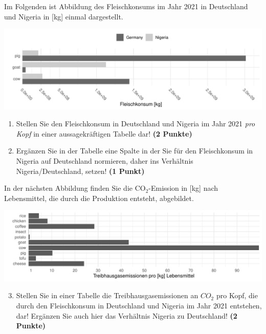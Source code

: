 \documentclass[a4paper, 9pt]{scrartcl}\usepackage[]{graphicx}\usepackage[]{xcolor}
\makeatletter
\def\maxwidth{ %
  \ifdim\Gin@nat@width>\linewidth
    \linewidth
  \else
    \Gin@nat@width
  \fi
}
\newenvironment{knitrout}{}{} %
\makeatother
\begin{document}
Im Folgenden ist Abbildung des Fleischkonsums im Jahr 2021 in Deutschland und Nigeria in [kg] einmal dargestellt. 

\begin{knitrout}
\color{fgcolor}

{\centering \includegraphics[width=\maxwidth]{img/math-14-a-1} 

}


\end{knitrout}
  
\begin{enumerate}
\item Stellen Sie den Fleischkonsum in Deutschland und Nigeria im Jahr 2021 \textit{pro Kopf} in einer aussagekräftigen Tabelle dar! \textbf{(2 Punkte)}
\item Ergänzen Sie in der Tabelle eine Spalte in der Sie für den Fleischkonsum in Nigeria auf Deutschland normieren, daher ins Verhältnis Nigeria/Deutschland, setzen! \textbf{(1 Punkt)}
\end{enumerate}

In der nächsten Abbildung finden Sie die CO$_2$-Emission in [kg] nach Lebensmittel, die durch die Produktion entsteht, abgebildet.

\begin{knitrout}
\color{fgcolor}

{\centering \includegraphics[width=\maxwidth]{img/math-14-b-1} 

}


\end{knitrout}

\begin{enumerate}
  \setcounter{enumi}{2}  
\item Stellen Sie in einer Tabelle die Treibhausgasemissionen an $CO_2$ pro Kopf, die durch den Fleischkonsum in Deutschland und Nigeria im Jahr 2021 entstehen, dar! Ergänzen Sie auch hier das Verhältnis Nigeria zu Deutschland! \textbf{(2 Punkte)}
\end{enumerate}
\end{document}
